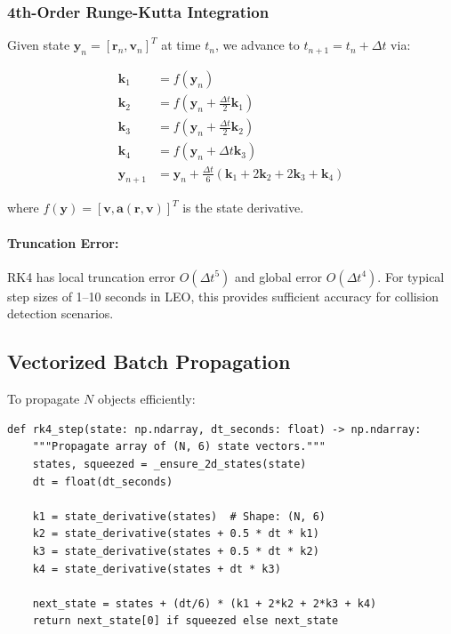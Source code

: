 \documentclass[11pt,a4paper]{article}
\begin{document}
\subsubsection{4th-Order Runge-Kutta Integration}

Given state $\mathbf{y}_n = [\mathbf{r}_n, \mathbf{v}_n]^T$ at time $t_n$, we advance to $t_{n+1} = t_n + \Delta t$ via:

\begin{align}
\mathbf{k}_1 &= f(\mathbf{y}_n) \\
\mathbf{k}_2 &= f(\mathbf{y}_n + \frac{\Delta t}{2} \mathbf{k}_1) \\
\mathbf{k}_3 &= f(\mathbf{y}_n + \frac{\Delta t}{2} \mathbf{k}_2) \\
\mathbf{k}_4 &= f(\mathbf{y}_n + \Delta t \mathbf{k}_3) \\
\mathbf{y}_{n+1} &= \mathbf{y}_n + \frac{\Delta t}{6}(\mathbf{k}_1 + 2\mathbf{k}_2 + 2\mathbf{k}_3 + \mathbf{k}_4)
\end{align}

where $f(\mathbf{y}) = [\mathbf{v}, \mathbf{a}(\mathbf{r}, \mathbf{v})]^T$ is the state derivative.

\paragraph{Truncation Error:} RK4 has local truncation error $O(\Delta t^5)$ and global error $O(\Delta t^4)$. For typical step sizes of 1--10 seconds in LEO, this provides sufficient accuracy for collision detection scenarios.

\subsection{Vectorized Batch Propagation}

To propagate $N$ objects efficiently:

\begin{lstlisting}
def rk4_step(state: np.ndarray, dt_seconds: float) -> np.ndarray:
    """Propagate array of (N, 6) state vectors."""
    states, squeezed = _ensure_2d_states(state)
    dt = float(dt_seconds)
    
    k1 = state_derivative(states)  # Shape: (N, 6)
    k2 = state_derivative(states + 0.5 * dt * k1)
    k3 = state_derivative(states + 0.5 * dt * k2)
    k4 = state_derivative(states + dt * k3)
    
    next_state = states + (dt/6) * (k1 + 2*k2 + 2*k3 + k4)
    return next_state[0] if squeezed else next_state
\end{lstlisting}
\end{document}
